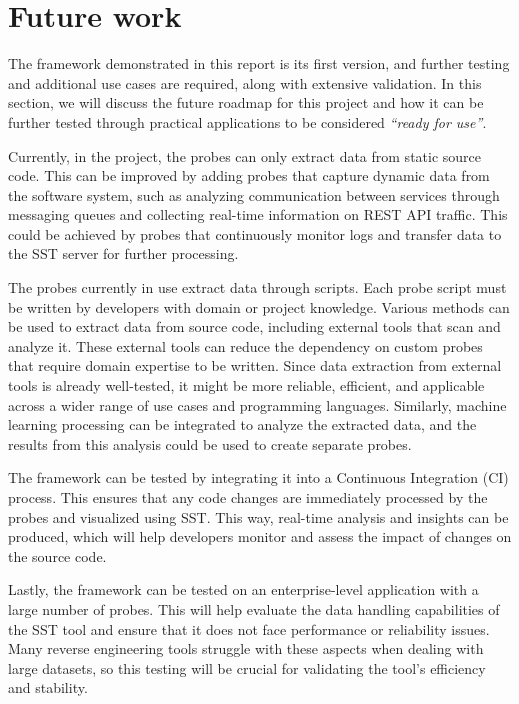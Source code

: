 \section{Future work}

The framework demonstrated in this report is its first version, and further testing and additional use cases are required, along with extensive validation. In this section, we will discuss the future roadmap for this project and how it can be further tested through practical applications to be considered \textit{``ready for use''}.

Currently, in the project, the probes can only extract data from static source code. This can be improved by adding probes that capture dynamic data from the software system, such as analyzing communication between services through messaging queues and collecting real-time information on REST API traffic. This could be achieved by probes that continuously monitor logs and transfer data to the SST server for further processing.

The probes currently in use extract data through scripts. Each probe script must be written by developers with domain or project knowledge. Various methods can be used to extract data from source code, including external tools that scan and analyze it. These external tools can reduce the dependency on custom probes that require domain expertise to be written. Since data extraction from external tools is already well-tested, it might be more reliable, efficient, and applicable across a wider range of use cases and programming languages. Similarly, machine learning processing can be integrated to analyze the extracted data, and the results from this analysis could be used to create separate probes.

The framework can be tested by integrating it into a Continuous Integration (CI) process. This ensures that any code changes are immediately processed by the probes and visualized using SST. This way, real-time analysis and insights can be produced, which will help developers monitor and assess the impact of changes on the source code.

Lastly, the framework can be tested on an enterprise-level application with a large number of probes. This will help evaluate the data handling capabilities of the SST tool and ensure that it does not face performance or reliability issues. Many reverse engineering tools struggle with these aspects when dealing with large datasets, so this testing will be crucial for validating the tool’s efficiency and stability.
